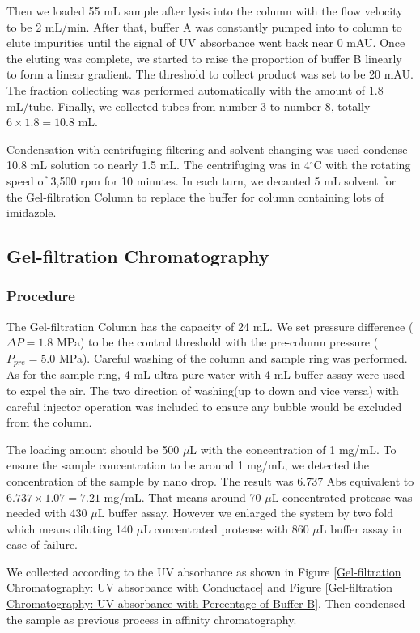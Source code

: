\documentclass{report}
\begin{document}
Then we loaded 55 mL sample after lysis into the column with the flow velocity to be 2 mL/min.
After that, buffer A was constantly pumped into to column to elute impurities until the signal of UV absorbance went back near 0 mAU.
Once the eluting was complete, we started to raise the proportion of buffer B linearly to form a linear gradient.
The threshold to collect product was set to be 20 mAU.
The fraction collecting was performed automatically with the amount of 1.8 mL/tube.
Finally, we collected tubes from number 3 to number 8, totally $6\times1.8=10.8$ mL.

Condensation with centrifuging filtering and solvent changing was used condense 10.8 mL solution to nearly 1.5 mL.
The centrifuging was in 4$^\circ$C with the rotating speed of 3,500 rpm for 10 minutes.
In each turn, we decanted 5 mL solvent for the Gel-filtration Column to replace the buffer for  column containing lots of imidazole.
\subsection{Gel-filtration Chromatography}
\subsubsection{Procedure}
The Gel-filtration Column has the capacity of 24 mL.
We set pressure difference ($\Delta P=1.8$ MPa) to be the control threshold with the pre-column pressure ($P_{pre}=5.0$ MPa).
Careful washing of the column and sample ring was performed.
As for the sample ring, 4 mL ultra-pure water with 4 mL buffer assay were used to expel the air.
The two direction of washing(up to down and vice versa) with careful injector operation was included to ensure any bubble would be excluded from the column.

The loading amount should be 500 $\mu$L with the concentration of 1 mg/mL.
To ensure the sample concentration to be around 1 mg/mL, we detected the concentration of the sample by nano drop.
The result was 6.737 Abs equivalent to $6.737\times1.07=7.21$ mg/mL.
That means around 70 $\mu$L concentrated protease was needed with 430 $\mu$L buffer assay.
However we enlarged the system by two fold which means diluting 140 $\mu$L concentrated protease with 860 $\mu$L buffer assay in case of failure.



We collected according to the UV absorbance as shown in Figure \ref{Gel-filtration Chromatography: UV absorbance with Conductace} and Figure \ref{Gel-filtration Chromatography: UV absorbance with Percentage of Buffer B}.
Then condensed the sample as previous process in affinity chromatography.
\end{document}
